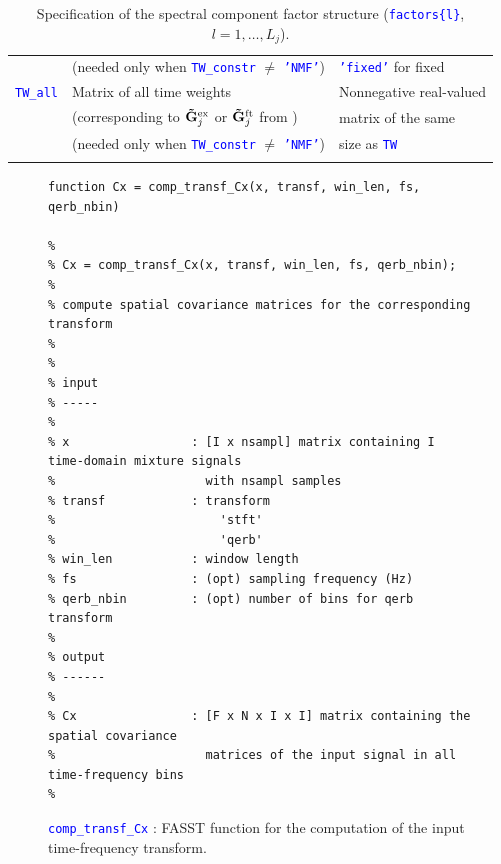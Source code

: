 \documentclass{article}
\newcommand{\matlabcolor}{blue}
\newcommand{\matvar}[1]{\textcolor{\matlabcolor}{\tt {#1}}}
\begin{document}
\begin{table}[t]
\begin{center}
\begin{tabular}{l|l|l}
      \hhline{~~-}
                       & (needed only when \matvar{TW\_constr} $\ne$ \matvar{'NMF'}) & \matvar{'fixed'} for fixed \\
      \hhline{---}
       \matvar{TW\_all} & Matrix of all time weights & Nonnegative real-valued \\
                       & (corresponding to ${\bf \tilde G}^{\rm ex}_j$ or ${\bf \tilde G}^{\rm ft}_j$ from \cite{Ozerov2010a}) & matrix of the same  \\
                       & (needed only when \matvar{TW\_constr} $\ne$ \matvar{'NMF'}) & size as \matvar{TW} \\
      \hhline{===}
    \end{tabular}
    \caption{Specification of the spectral component factor structure (\matvar{factors\{l\}}, $l = 1, \ldots, L_j$).
     }
    \label{Tab_Specfactor}
  \end{center}
\end{table}



\begin{figure}[t]
\begin{center}
	\begin{lstlisting}
function Cx = comp_transf_Cx(x, transf, win_len, fs, qerb_nbin)

%
% Cx = comp_transf_Cx(x, transf, win_len, fs, qerb_nbin);
%
% compute spatial covariance matrices for the corresponding transform
%
%
% input 
% -----
%
% x                 : [I x nsampl] matrix containing I time-domain mixture signals
%                     with nsampl samples
% transf            : transform
%                       'stft'
%                       'qerb'
% win_len           : window length
% fs                : (opt) sampling frequency (Hz)
% qerb_nbin         : (opt) number of bins for qerb transform
%
% output
% ------
%
% Cx                : [F x N x I x I] matrix containing the spatial covariance
%                     matrices of the input signal in all time-frequency bins
%
	\end{lstlisting}
    \caption{\matvar{comp\_transf\_Cx} : FASST function for the computation of the input time-frequency transform.}
    \label{Tab_FuncCompTransf}
\end{center}
\end{figure}
\end{document}
